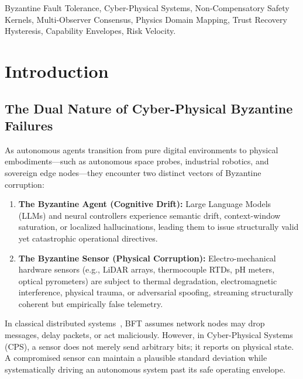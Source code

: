\documentclass[conference]{IEEEtran}
\begin{document}
\begin{abstract}
We critique recent literature claiming ``100\% mathematical certainty'' in safety-critical systems, demonstrating that physical sensor degradation invalidates pure geometric cages. We validate our framework through a C++ experimental demonstration in the Sovereign Engine (Unreal Engine 5 / C++ sub-system architecture), evaluating deterministic fault isolation, discrete risk velocity throttling, zero-chatter hysteresis, and bounded trust recovery under adversarial sensor corruption and cognitive drift.
\end{abstract}

\begin{IEEEkeywords}
Byzantine Fault Tolerance, Cyber-Physical Systems, Non-Compensatory Safety Kernels, Multi-Observer Consensus, Physics Domain Mapping, Trust Recovery Hysteresis, Capability Envelopes, Risk Velocity.
\end{IEEEkeywords}

\section{Introduction}

\subsection{The Dual Nature of Cyber-Physical Byzantine Failures}
As autonomous agents transition from pure digital environments to physical embodiments---such as autonomous space probes, industrial robotics, and sovereign edge nodes---they encounter two distinct vectors of Byzantine corruption:
\begin{enumerate}
    \item \textbf{The Byzantine Agent (Cognitive Drift):} Large Language Models (LLMs) and neural controllers experience semantic drift, context-window saturation, or localized hallucinations, leading them to issue structurally valid yet catastrophic operational directives.
    \item \textbf{The Byzantine Sensor (Physical Corruption):} Electro-mechanical hardware sensors (e.g., LiDAR arrays, thermocouple RTDs, pH meters, optical pyrometers) are subject to thermal degradation, electromagnetic interference, physical trauma, or adversarial spoofing, streaming structurally coherent but empirically false telemetry.
\end{enumerate}

In classical distributed systems~\cite{lamport1982byzantine}, BFT assumes network nodes may drop messages, delay packets, or act maliciously. However, in Cyber-Physical Systems (CPS), a sensor does not merely send arbitrary bits; it reports on physical state. A compromised sensor can maintain a plausible standard deviation while systematically driving an autonomous system past its safe operating envelope.
\end{document}
